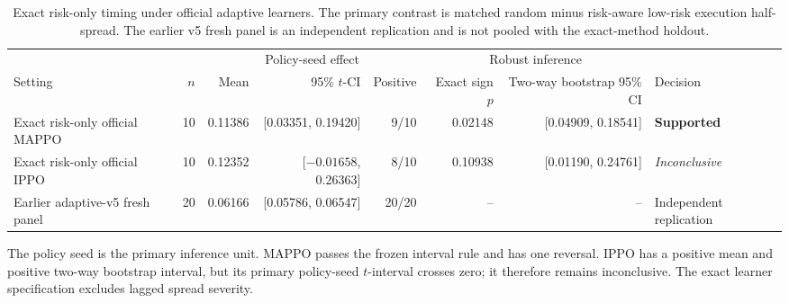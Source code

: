 \begin{table}[t]
\centering
\caption{Exact risk-only timing under official adaptive learners. The primary
contrast is matched random minus risk-aware low-risk execution half-spread.
The earlier v5 fresh panel is an independent replication and is not pooled
with the exact-method holdout.}
\label{tab:transfer-results}
\footnotesize
\setlength{\tabcolsep}{3.0pt}
\begin{tabular*}{\textwidth}{@{\extracolsep{\fill}}lrrrrrrl@{}}
\toprule
& & \multicolumn{3}{c}{Policy-seed effect}
& \multicolumn{2}{c}{Robust inference} & \\
\cmidrule(lr){3-5}\cmidrule(lr){6-7}
Setting & $n$ & Mean & 95\% $t$-CI & Positive & Exact sign $p$
& Two-way bootstrap 95\% CI & Decision \\
\midrule
Exact risk-only official MAPPO & 10 & 0.11386 & [0.03351, 0.19420] & 9/10
& 0.02148 & [0.04909, 0.18541] & \textbf{Supported} \\
Exact risk-only official IPPO & 10 & 0.12352 & [$-0.01658$, 0.26363] & 8/10
& 0.10938 & [0.01190, 0.24761] & \emph{Inconclusive} \\
\rowcolor{black!2}
Earlier adaptive-v5 fresh panel & 20 & 0.06166 & [0.05786, 0.06547] & 20/20
& -- & -- & Independent replication \\
\bottomrule
\end{tabular*}
\vspace{2pt}
\parbox{\textwidth}{\scriptsize
The policy seed is the primary inference unit. MAPPO passes the frozen
interval rule and has one reversal. IPPO has a positive mean and positive
two-way bootstrap interval, but its primary policy-seed $t$-interval crosses
zero; it therefore remains inconclusive. The exact learner specification
excludes lagged spread severity.}
\end{table}
